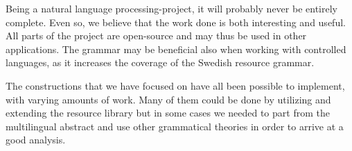\documentclass{report}
\begin{document}
Being a natural language processing-project, it will probably never be
entirely complete. Even so, we believe  
that the work done is both interesting and useful.
All parts of the project are open-source and may thus be used in other applications.
The grammar may be beneficial also when working with controlled languages,
as it increases the coverage of the Swedish resource grammar.

The constructions
that we have focused on have all been possible to implement, with varying  amounts
of work. Many of them could be done by utilizing and extending the resource library
but in some cases we needed to part from the multilingual abstract and use other
grammatical theories in order to arrive at a good analysis.








\end{document}

